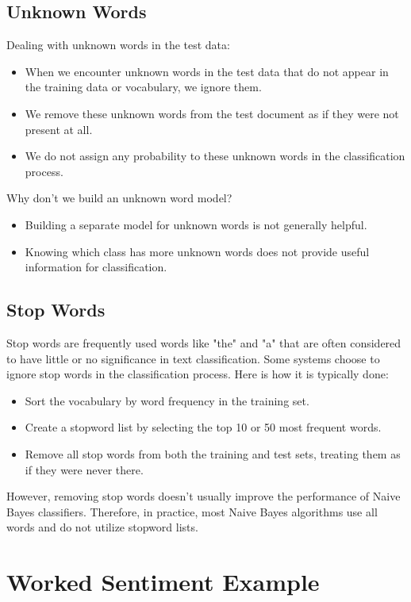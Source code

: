 \documentclass{book}
\begin{document}
\subsection{Unknown Words}
Dealing with unknown words in the test data:
\begin{itemize}
    \item When we encounter unknown words in the test data that do not appear in the training data or vocabulary, we ignore them.
    \item We remove these unknown words from the test document as if they were not present at all.
    \item We do not assign any probability to these unknown words in the classification process.
\end{itemize}

Why don't we build an unknown word model?
\begin{itemize}
    \item Building a separate model for unknown words is not generally helpful.
    \item Knowing which class has more unknown words does not provide useful information for classification.
\end{itemize}

\subsection{Stop Words}

Stop words are frequently used words like "the" and "a" that are often considered to have little or no significance in text classification. Some systems choose to ignore stop words in the classification process. Here is how it is typically done:

\begin{itemize}
    \item Sort the vocabulary by word frequency in the training set.
    \item Create a stopword list by selecting the top 10 or 50 most frequent words.
    \item Remove all stop words from both the training and test sets, treating them as if they were never there.
\end{itemize}

However, removing stop words doesn't usually improve the performance of Naive Bayes classifiers. Therefore, in practice, most Naive Bayes algorithms use all words and do not utilize stopword lists.


\section{Worked Sentiment Example}
\end{document}

